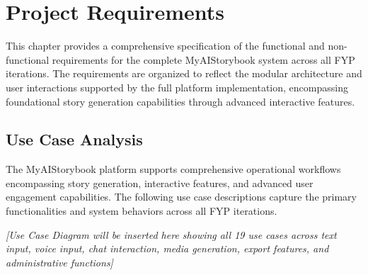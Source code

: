\chapter{Project Requirements}
\label{sec:requirements}
This chapter provides a comprehensive specification of the functional and non-functional requirements for the complete MyAIStorybook system across all FYP iterations. The requirements are organized to reflect the modular architecture and user interactions supported by the full platform implementation, encompassing foundational story generation capabilities through advanced interactive features.

\section{Use Case Analysis}
The MyAIStorybook platform supports comprehensive operational workflows encompassing story generation, interactive features, and advanced user engagement capabilities. The following use case descriptions capture the primary functionalities and system behaviors across all FYP iterations.

\vspace{3cm}
\begin{center}
\textit{[Use Case Diagram will be inserted here showing all 19 use cases across text input, voice input, chat interaction, media generation, export features, and administrative functions]}
\end{center}
\vspace{2cm}

